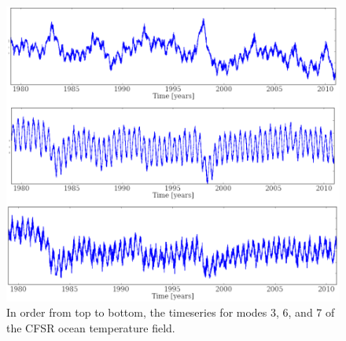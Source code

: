   \begin{figure}[h!bt]
    \centering
    \includegraphics[width=.9\columnwidth]{images/climate_timeseries.pdf}
    \caption{In order from top to bottom, the timeseries for modes 3, 6, and 7 of the CFSR ocean temperature field.}
        \label{fig:climate_timeseries}
  \end{figure} 

